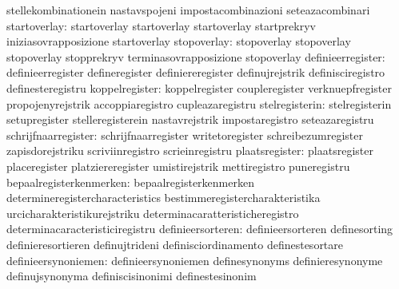                                   stellekombinationein             nastavspojeni
                                  impostacombinazioni              seteazacombinari
                    startoverlay: startoverlay                     startoverlay
                                  startoverlay                     startprekryv
                                  iniziasovrapposizione            startoverlay
                     stopoverlay: stopoverlay                      stopoverlay
                                  stopoverlay                      stopprekryv
                                  terminasovrapposizione           stopoverlay
               definieerregister: definieerregister                defineregister
                                  definiereregister                definujrejstrik
                                  definisciregistro                definesteregistru
                  koppelregister: koppelregister                   coupleregister
                                  verknuepfregister                propojenyrejstrik
                                  accoppiaregistro                 cupleazaregistru
                  stelregisterin: stelregisterin                   setupregister
                                  stelleregisterein                nastavrejstrik
                                  impostaregistro                  seteazaregistru
             schrijfnaarregister: schrijfnaarregister              writetoregister
                                  schreibezumregister              zapisdorejstriku
                                  scriviinregistro                 scrieinregistru
                  plaatsregister: plaatsregister                   placeregister
                                  platziereregister                umistirejstrik
                                  mettiregistro                    puneregistru
         bepaalregisterkenmerken: bepaalregisterkenmerken          determineregistercharacteristics
                                  bestimmeregistercharakteristika  urcicharakteristikurejstriku
                                  determinacaratteristicheregistro determinacaracteristiciregistru
               definieersorteren: definieersorteren                definesorting
                                  definieresortieren               definujtrideni
                                  definisciordinamento             definestesortare
             definieersynoniemen: definieersynoniemen              definesynonyms
                                  definieresynonyme                definujsynonyma
                                  definiscisinonimi                definestesinonim
